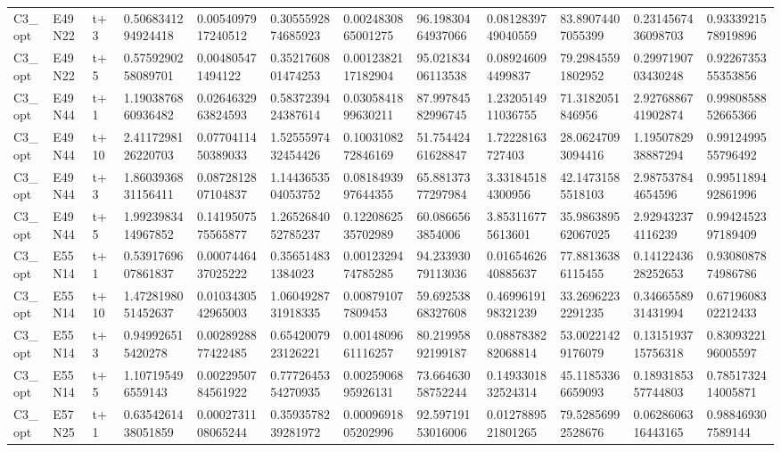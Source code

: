 \begin{landscape}
\begin{longtable}{llllllllllll}
C3\_opt & E49N22 & t+3 & 0.5068341294924418 & 0.0054097917240512 & 0.3055592874685923 & 0.0024830865001275 & 96.19830464937066 & 0.0812839749040559 & 83.89074407055399 & 0.2314567436098703 & 0.9333921578919896 \\
C3\_opt & E49N22 & t+5 & 0.5759290258089701 & 0.004805471494122 & 0.3521760801474253 & 0.0012382117182904 & 95.02183406113538 & 0.089246094499837 & 79.29845591802952 & 0.2997190703430248 & 0.9226735355353856 \\
C3\_opt & E49N44 & t+1 & 1.1903876860936482 & 0.0264632963824593 & 0.5837239424387614 & 0.0305841899630211 & 87.99784582996745 & 1.2320514911036755 & 71.3182051846956 & 2.9276886741902874 & 0.9980858852665366 \\
C3\_opt & E49N44 & t+10 & 2.4117298126220703 & 0.0770411450389033 & 1.5255597432454426 & 0.1003108272846169 & 51.75442461628847 & 1.72228163727403 & 28.06247093094416 & 1.1950782938887294 & 0.9912499555796492 \\
C3\_opt & E49N44 & t+3 & 1.8603936831156411 & 0.0872812807104837 & 1.1443653504053752 & 0.0818493997644355 & 65.88137377297984 & 3.331845184300956 & 42.14731585518103 & 2.987537844654596 & 0.9951189492861996 \\
C3\_opt & E49N44 & t+5 & 1.9923983414967852 & 0.1419507575565877 & 1.2652684052785237 & 0.1220862535702989 & 60.0866563854006 & 3.853116775613601 & 35.986389562067025 & 2.929432374116239 & 0.9942452397189409 \\
C3\_opt & E55N14 & t+1 & 0.5391769607861837 & 0.0007446437025222 & 0.356514831384023 & 0.0012329474785285 & 94.23393079113036 & 0.0165462640885637 & 77.88136386115455 & 0.1412243628252653 & 0.9308087874986786 \\
C3\_opt & E55N14 & t+10 & 1.4728198051452637 & 0.0103430542965003 & 1.0604928731918335 & 0.008791077809453 & 59.69253868327608 & 0.4699619198321239 & 33.26962232291235 & 0.3466558931431994 & 0.6719608302212433 \\
C3\_opt & E55N14 & t+3 & 0.949926515420278 & 0.0028928877422485 & 0.6542007923126221 & 0.0014809661116257 & 80.21995892199187 & 0.0887838282068814 & 53.00221429176079 & 0.1315193715756318 & 0.8309322196005597 \\
C3\_opt & E55N14 & t+5 & 1.107195496559143 & 0.0022950784561922 & 0.7772645354270935 & 0.0025906895926131 & 73.66463058752244 & 0.1493301832524314 & 45.11853366659093 & 0.1893185357744803 & 0.7851732414005871 \\
C3\_opt & E57N25 & t+1 & 0.6354261438051859 & 0.0002731108065244 & 0.3593578239281972 & 0.0009691805202996 & 92.59719153016006 & 0.0127889521801265 & 79.52856992528676 & 0.0628606316443165 & 0.988469307589144 \\

\end{longtable}
\end{landscape}
